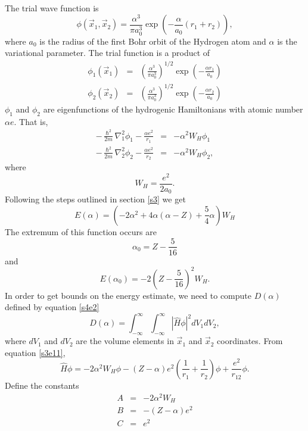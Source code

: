\documentclass{article}
\numberwithin{equation}{section}
\begin{document}
The trial wave function is
\begin{equation}\label{s5e49}
\phi(\vec{x}_1, \vec{x}_2) = \frac{\alpha^3}{\pi a_0^3}
\exp\left(-\frac{\alpha}{a_0}(r_1 + r_2)\right),
\end{equation}
where $a_0$ is the radius of the first Bohr orbit of the Hydrogen atom
and $\alpha$ is the variational parameter. The trial function is a 
product of
\begin{eqnarray}
\phi_1(\vec{x}_1) &=& \left(\frac{\alpha^{3}}{\pi a_0^3}\right)^{1/2}
\exp\left(-\frac{\alpha r_1}{a_0}\right) \label{s5e50} \\
\phi_2(\vec{x}_2) &=& \left(\frac{\alpha^{3}}{\pi a_0^3}\right)^{1/2}
\exp\left(-\frac{\alpha r_2}{a_0}\right) \label{s5e51}
\end{eqnarray}
$\phi_1$ and $\phi_2$ are eigenfunctions of the hydrogenic Hamiltonians 
with atomic number $\alpha e$. That is,
\begin{eqnarray}
-\frac{\hslash^2}{2m}\nabla_1^2\phi_1 - \frac{\alpha e^2}{r_1} &=& 
-\alpha^2W_H\phi_1 \label{s5e52} \\
-\frac{\hslash^2}{2m}\nabla_2^2\phi_2 - \frac{\alpha e^2}{r_2} &=& 
-\alpha^2W_H\phi_2 \label{s5e53}, 
\end{eqnarray}
where 
\begin{equation}\label{s5e54}
W_H = \frac{e^2}{2a_0}.
\end{equation}
Following the steps outlined in section \ref{s3} we get
\begin{equation}\label{s5e55}
E(\alpha) = 
\left(-2\alpha^2 + 4\alpha(\alpha - Z) + \frac{5}{4}\alpha\right)W_H
\end{equation}
The extremum of this function occurs are
\begin{equation}\label{s5e56}
\alpha_0 = Z - \frac{5}{16}
\end{equation}
and
\begin{equation}\label{s5e57}
E(\alpha_0) = -2\left(Z - \frac{5}{16}\right)^2 W_H.
\end{equation}
In order to get bounds on the energy estimate, we need to compute
$D(\alpha)$ defined by equation \eqref{s4e2}
\[
D(\alpha) = \int_{-\infty}^\infty \int_{-\infty}^\infty 
|\hat{H}\phi|^2 dV_1 dV_2,
\]
where $dV_1$ and $dV_2$ are the volume elements in $\vec{x}_1$ and 
$\vec{x}_2$ coordinates. From equation \eqref{s3e11},
\[
\hat{H}\phi = -2\alpha^2W_H\phi - (Z - \alpha)e^2\left(\frac{1}{r_1}
+ \frac{1}{r_2}\right)\phi + \frac{e^2}{r_{12}}\phi.
\]
Define the constants
\begin{eqnarray}
A &=& -2\alpha^2 W_H \label{s5e58} \\
B &=& -(Z - \alpha) e^2 \label{s5e59} \\
C &=& e^2 \label{s5e60}
\end{eqnarray}
\end{document}
